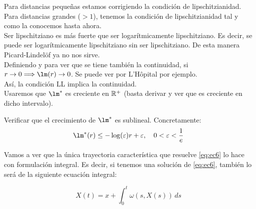 \begin{definicion}
\begin{figure}
\begin{center}
        \end{center}
    \end{figure}

\end{definicion}

\begin{observacion}
    Para distancias pequeñas estamos corrigiendo la condición de lipschitzianidad. Para distancias grandes ($>1$), tenemos la condición de lipschitzianidad
    tal y como la conocemos hasta ahora. \\

    Ser lipschitziano es más fuerte que ser logarítmicamente lipschitziano. Es decir, se puede ser logarítmicamente lipschitziano sin ser lipschitziano.
    De esta manera Picard-Lindelöf ya no nos sirve. \\

    Definiendo \Func{\lm}{\left] 0, 1 \right]}{\R}{r}{\lm(r) = r(1-\log(r))}
    y  
    para ver que se tiene también la continuidad, si $r \to 0 \Longrightarrow \lm(r) \to 0$. Se puede ver por L'Hôpital por ejemplo. \\
    
    Así, la condición LL implica la continuidad. \\

    Usaremos que $\lm^{*}$ es creciente en $\mathbb{R}^{+}$ (basta derivar y ver que es creciente en dicho intervalo).
\end{observacion}

\begin{ejercicio}\label{ejercicio:ej22} %
    Verificar que el crecimiento de $\lm^{*}$ es sublineal. Concretamente:
    $$\lm^{*}(r) \leq - \log(\varepsilon) r + \varepsilon, \quad 0 < \varepsilon < \dfrac{1}{e}$$
\end{ejercicio}

Vamos a ver que la única trayectoria característica que resuelve \eqref{eq:ec6} lo hace con formulación integral. Es decir, 
si tenemos una solución de \eqref{eq:ec6}, también lo será de la siguiente ecuación integral:

\begin{equation}
    X(t) = x + \int_{0}^{t} \omega(s,X(s))\,ds
\end{equation}

